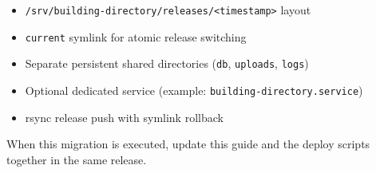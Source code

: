 \documentclass[11pt,letterpaper]{article}
\begin{document}
\begin{itemize}
\item \texttt{/srv/building-directory/releases/<timestamp>} layout
\item \texttt{current} symlink for atomic release switching
\item Separate persistent shared directories (\texttt{db}, \texttt{uploads}, \texttt{logs})
\item Optional dedicated service (example: \texttt{building-directory.service})
\item rsync release push with symlink rollback
\end{itemize}

When this migration is executed, update this guide and the deploy scripts together in the same release.
\end{document}

